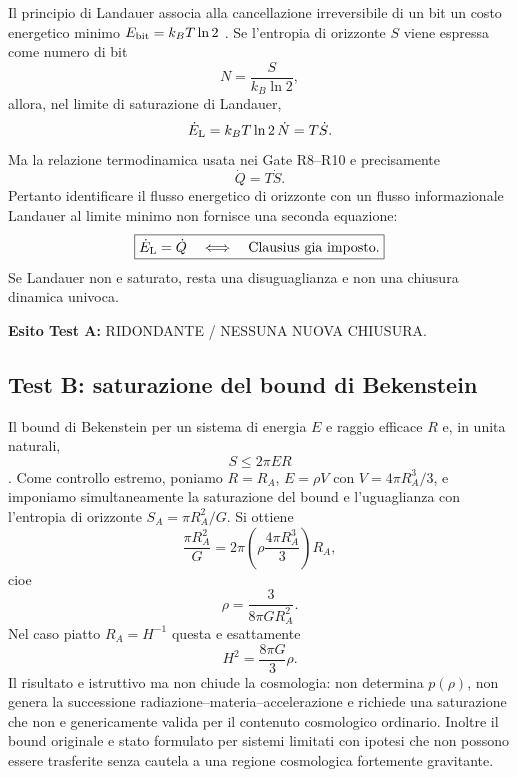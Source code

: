 \documentclass[11pt,a4paper]{article}
\newcommand{\status}[1]{\textsf{#1}}
\begin{document}
Il principio di Landauer associa alla cancellazione irreversibile di un bit un costo energetico minimo $E_{\rm bit}=k_B T\ln2$ \cite{Landauer1961}. Se l'entropia di orizzonte $S$ viene espressa come numero di bit
\begin{equation}
 N=\frac{S}{k_B\ln2},
\end{equation}
allora, nel limite di saturazione di Landauer,
\begin{equation}
 \dot E_{\rm L}=k_B T\ln2\,\dot N=T\dot S.
\end{equation}
Ma la relazione termodinamica usata nei Gate R8--R10 e precisamente
\begin{equation}
 \dot Q=T\dot S.
\end{equation}
Pertanto identificare il flusso energetico di orizzonte con un flusso informazionale Landauer al limite minimo non fornisce una seconda equazione:
\begin{equation}
 \boxed{\dot E_{\rm L}=\dot Q\quad\Longleftrightarrow\quad \text{Clausius gia imposto}.}
\end{equation}
Se Landauer non e saturato, resta una disuguaglianza e non una chiusura dinamica univoca.

\textbf{Esito Test A:} \status{RIDONDANTE / NESSUNA NUOVA CHIUSURA}.

\subsection{Test B: saturazione del bound di Bekenstein}

Il bound di Bekenstein per un sistema di energia $E$ e raggio efficace $R$ e, in unita naturali,
\begin{equation}
 S\leq2\pi E R
\end{equation}
\cite{Bekenstein1981}. Come controllo estremo, poniamo $R=R_A$, $E=\rho V$ con $V=4\pi R_A^3/3$, e imponiamo simultaneamente la saturazione del bound e l'uguaglianza con l'entropia di orizzonte $S_A=\pi R_A^2/G$. Si ottiene
\begin{equation}
 \frac{\pi R_A^2}{G}=2\pi\left(\rho\frac{4\pi R_A^3}{3}\right)R_A,
\end{equation}
cioe
\begin{equation}
 \boxed{\rho=\frac{3}{8\pi G R_A^2}.}
\end{equation}
Nel caso piatto $R_A=H^{-1}$ questa e esattamente
\begin{equation}
 \boxed{H^2=\frac{8\pi G}{3}\rho.}
\end{equation}
Il risultato e istruttivo ma non chiude la cosmologia: non determina $p(\rho)$, non genera la successione radiazione--materia--accelerazione e richiede una saturazione che non e genericamente valida per il contenuto cosmologico ordinario. Inoltre il bound originale e stato formulato per sistemi limitati con ipotesi che non possono essere trasferite senza cautela a una regione cosmologica fortemente gravitante.
\end{document}

